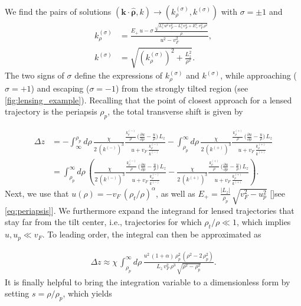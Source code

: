 \documentclass[submission, Phys]{SciPost}
\begin{document}
\begin{appendix}
We find the pairs of solutions $(\bm k \cdot \hat{\bm \rho},k) \to (k_\rho^{(\sigma)},k^{(\sigma)})$ with $\sigma=\pm1$ and
\begin{align}
    k_\rho^{(\sigma)}&= \frac{E_+\,u-\sigma\,\frac{\sqrt{L_z^2\,u^2\,v_F^2-L_z^2\,v_F^4+E_+^2\,v_F^2\,\rho^2}}{\rho}}{u^2-v_F^2},\\
    k^{(\sigma)} &=\sqrt{\left(k_\rho^{(\sigma)}\right)^2+\frac{L_z^2}{\rho^2}}.
\end{align}
The two signs of $\sigma$ define the expressions of $k_\rho^{(\sigma)}$ and $k^{(\sigma)}$, while approaching ($\sigma = +1$) and escaping ($\sigma=-1$) from the strongly tilted region (see \cref{fig:lensing_example}).
Recalling that the point of closest approach for a lensed trajectory is the periapsis $\rho_p$, the total transverse shift is given by 

\begin{align}
    \Delta z &= -\int_{\infty}^{\rho_p}d\rho\,\frac{\chi}{2\,(k^{(-)})^3}\frac{\frac{ k_\rho^{(-)}}{\rho}\, \bigg( \frac{\partial u}{\partial \rho}-\frac{u}{\rho}\bigg)\,L_z}{u+v_F\,\frac{k_\rho^{(-)}}{k^{(-)}}}-\int^{\infty}_{\rho_p}d\rho\,\frac{\chi}{2\,(k^{(+)})^3}\frac{\frac{ k_\rho^{(+)}}{\rho}\, \bigg( \frac{\partial u}{\partial \rho}-\frac{u}{\rho}\bigg)\,L_z}{u+v_F\,\frac{k_\rho^{(+)}}{k^{(+)}}}\nonumber\\
    &= \int^{\infty}_{\rho_p}d\rho\,\left(\frac{\chi}{2\,(k^{(-)})^3}\frac{\frac{ k_\rho^{(-)}}{\rho}\, \bigg( \frac{\partial u}{\partial \rho}-\frac{u}{\rho}\bigg)\,L_z}{u+v_F\,\frac{k_\rho^{(-)}}{k^{(-)}}}-\frac{\chi}{2\,(k^{(+)})^3}\frac{\frac{ k_\rho^{(+)}}{\rho}\, \bigg( \frac{\partial u}{\partial \rho}-\frac{u}{\rho}\bigg)\,L_z}{u+v_F\,\frac{k_\rho^{(+)}}{k^{(+)}}}\right).
    \label{eq:transverse_shift_integral}
\end{align}
Next, we use that $u(\rho)=-v_F\,(\rho_t/\rho)^\alpha$, as well as $E_+ = \frac{|L_z|}{\rho_p}\,\sqrt{v_F^2-u_p^2}$ []see \cref{eq:periapsis}]. We furthermore expand the integrand for lensed trajectories that stay far from the tilt center, i.e., trajectories for which $\rho_t/\rho\ll1$, which implies $u,u_p\ll v_F$. To leading order, the integral can then be approximated as

\begin{align}
    \Delta z\approx\chi\,\int_{\rho_p}^\infty d\rho\,\frac{u^2\,(1+\alpha)\,\rho_p^2\,(\rho^2-2\,\rho_p^2)}{L_z\,v_F^2\,\rho^3\,\sqrt{\rho^2-\rho_p^2}}.
\end{align}
It is finally helpful to bring the integration variable to a dimensionless form by setting $s=\rho/\rho_p$, which yields


\end{appendix}
\end{document}
